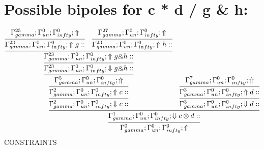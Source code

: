 \documentclass[a4paper, 11pt]{article}
\begin{document}
\section{Possible bipoles for c * d / g \& h:} 

\[
\infer{\Gamma_{ gamma}^{0} ; \Gamma_{un}^{0} ; \Gamma_{ infty}^{0} ;  \Uparrow }
{\infer{\Gamma_{ gamma}^{1} ; \Gamma_{un}^{0} ; \Gamma_{ infty}^{0} ;  \Downarrow c \otimes d :: }
{\infer{\Gamma_{ gamma}^{2} ; \Gamma_{un}^{0} ; \Gamma_{ infty}^{0} ;  \Downarrow c :: }
{\infer{\Gamma_{ gamma}^{2} ; \Gamma_{un}^{0} ; \Gamma_{ infty}^{0} ;  \Uparrow c :: }
{\infer{\Gamma_{ gamma}^{5} ; \Gamma_{un}^{0} ; \Gamma_{ infty}^{0} ;  \Uparrow }
{\infer{\Gamma_{ gamma}^{23} ; \Gamma_{un}^{0} ; \Gamma_{ infty}^{0} ;  \Downarrow g \binampersand h :: }
{\infer{\Gamma_{ gamma}^{23} ; \Gamma_{un}^{0} ; \Gamma_{ infty}^{0} ;  \Uparrow g \binampersand h :: }
{\infer{\Gamma_{ gamma}^{23} ; \Gamma_{un}^{0} ; \Gamma_{ infty}^{0} ;  \Uparrow g :: }
{\Gamma_{ gamma}^{25} ; \Gamma_{un}^{0} ; \Gamma_{ infty}^{0} ;  \Uparrow }
&
\infer{\Gamma_{ gamma}^{23} ; \Gamma_{un}^{0} ; \Gamma_{ infty}^{0} ;  \Uparrow h :: }
{\Gamma_{ gamma}^{27} ; \Gamma_{un}^{0} ; \Gamma_{ infty}^{0} ;  \Uparrow }}}}}}
&
\infer{\Gamma_{ gamma}^{3} ; \Gamma_{un}^{0} ; \Gamma_{ infty}^{0} ;  \Downarrow d :: }
{\infer{\Gamma_{ gamma}^{3} ; \Gamma_{un}^{0} ; \Gamma_{ infty}^{0} ;  \Uparrow d :: }
{\Gamma_{ gamma}^{7} ; \Gamma_{un}^{0} ; \Gamma_{ infty}^{0} ;  \Uparrow }}}}
\]
CONSTRAINTS
\end{document}
